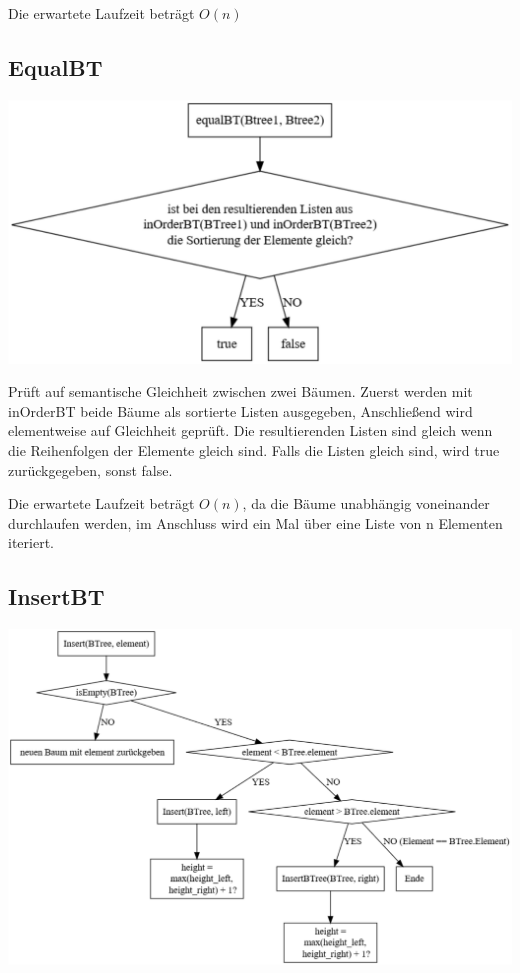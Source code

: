 \documentclass[11pt]{article}
\begin{document}
    Die erwartete Laufzeit beträgt
    \begin{math}
        O(n)
    \end{math}

    \subsection{EqualBT}\label{subsec:equalbt}
    
    \begin{center}
        \includegraphics[width=0.7\columnwidth] {equal.pdf}
    \end{center}
    
    Prüft auf semantische Gleichheit zwischen zwei Bäumen.
    Zuerst werden mit inOrderBT beide Bäume als sortierte Listen ausgegeben,
    Anschließend wird elementweise auf Gleichheit geprüft.
    Die resultierenden Listen sind gleich wenn die Reihenfolgen der Elemente gleich sind.
    Falls die Listen gleich sind, wird true zurückgegeben, sonst false.

    Die erwartete Laufzeit beträgt
    \begin{math}
        O(n)
    \end{math},
    da die Bäume unabhängig voneinander durchlaufen werden, im Anschluss wird
    ein Mal über eine Liste von n Elementen iteriert.

    \subsection{InsertBT}\label{subsec:insertbt}

    \begin{center}
        \includegraphics[width=1.1\columnwidth] {insert.pdf}
    \end{center}
\end{document}
